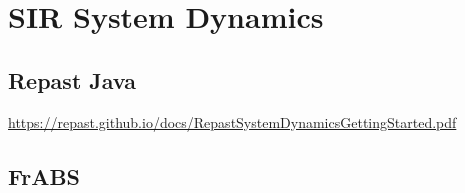 \section{SIR System Dynamics}

\subsection{Repast Java}
\url{https://repast.github.io/docs/RepastSystemDynamicsGettingStarted.pdf}

\subsection{FrABS}